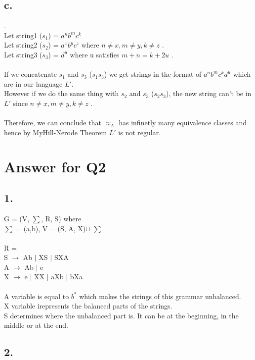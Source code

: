 \documentclass[12pt]{article}
\begin{document}
\subsection*{c.} 
.\\
Let string1 ($s_1$) = $a^n b^m c^k$\\
Let string2 ($s_2$) = $a^x b^y c^z$ where $n \neq x, m \neq y, k \neq z$ .\\
Let string3 ($s_3$) = $d^u$ where u satisfies $m+n = k+2u$ .\\ 
\\
If we concatenate $s_1$ and $s_3$ ($s_1 s_3$) we get strings in the format of   $a^n b^m c^k d^u $ which are in our language $L'$.\\
However if we do the same thing with $s_2$ and $s_3$ ($s_2 s_3$), the new string can't be in $L'$ since $n \neq x, m \neq y, k \neq z$ .\\
\\
Therefore, we can conclude that $\approx_L$ has infinetly many equivalence classes and hence by MyHill-Nerode Theorem $L'$ is not regular.
 

\section*{Answer for Q2}
\subsection*{1.} 

G = (V, $\sum$, R, S) where \\
$\sum$ = (a,b), V = (S, A, X)$\cup$ $\sum$\\
\\
R =\\ 
S $\rightarrow$ Ab $|$ XS $|$ SXA \\
A $\rightarrow$ Ab $|$ e \\
X $\rightarrow$ e $|$ XX $|$ aXb $|$ bXa \\
\\
A variable is equal to $b^*$ which makes the strings of this grammar unbalanced.\\
X variable irepresents the balanced parts of the strings.\\
S determines where the unbalanced part is. It can be at the beginning, in the middle or at the end.\\ 


\subsection*{2.} 
\end{document}
